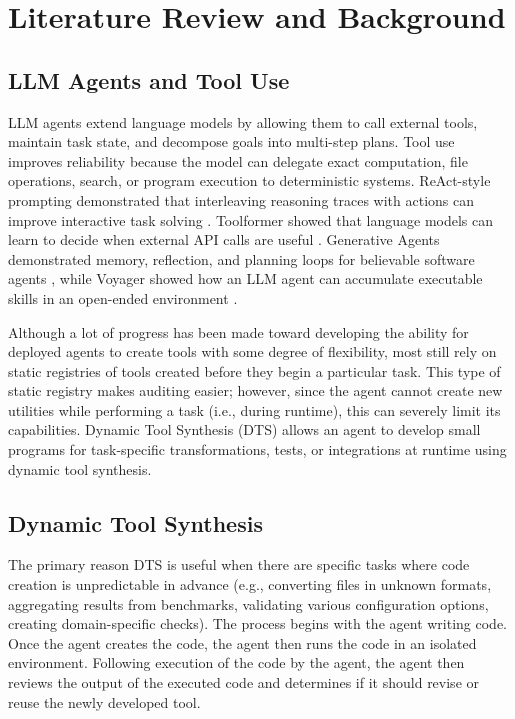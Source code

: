 
\chapter{Literature Review and Background}
\label{Chapter2}

\section{LLM Agents and Tool Use}
LLM agents extend language models by allowing them to call external tools,
maintain task state, and decompose goals into multi-step plans. Tool use improves
reliability because the model can delegate exact computation, file operations,
search, or program execution to deterministic systems. ReAct-style prompting
demonstrated that interleaving reasoning traces with actions can improve
interactive task solving \cite{yao2023react}. Toolformer showed that language
models can learn to decide when external API calls are useful
\cite{schick2023toolformer}. Generative Agents demonstrated memory, reflection,
and planning loops for believable software agents \cite{park2023generative},
while Voyager showed how an LLM agent can accumulate executable skills in an
open-ended environment \cite{wang2023voyager}.

Although a lot of progress has been made toward developing the ability for deployed agents to create tools with some degree of flexibility, most still rely on static registries of tools created before they begin a particular task. This type of static registry makes auditing easier; however, since the agent cannot create new utilities while performing a task (i.e., during runtime), this can severely limit its capabilities. Dynamic Tool Synthesis (DTS) allows an agent to develop small programs for task-specific transformations, tests, or integrations at runtime using dynamic tool synthesis.

\section{Dynamic Tool Synthesis}
The primary reason DTS is useful when there are specific tasks where code creation is unpredictable in advance (e.g., converting files in unknown formats, aggregating results from benchmarks, validating various configuration options, creating domain-specific checks). The process begins with the agent writing code. Once the agent creates the code, the agent then runs the code in an isolated environment. Following execution of the code by the agent, the agent then reviews the output of the executed code and determines if it should revise or reuse the newly developed tool.

